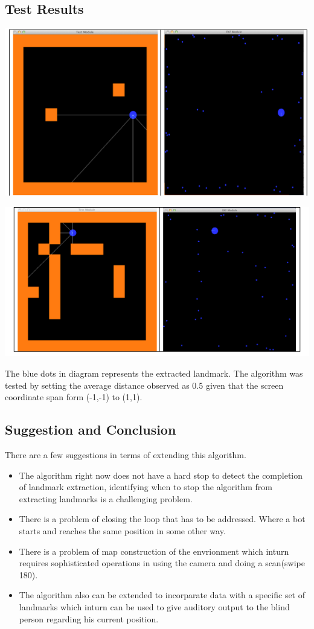 \documentclass[12pt]{article}
\begin{document}
\subsection{Test Results}
\begin{center} \includegraphics[scale=0.4]{p8} \end{center}
\begin{center} \includegraphics[scale=0.4]{p9} \end{center}

The blue dots in diagram represents the extracted landmark. The algorithm was tested by setting the average distance observed as 0.5 given that the screen coordinate span form (-1,-1) to (1,1)\cite{boost}.

\subsection{Suggestion and Conclusion}
There are a few suggestions in terms of extending this algorithm.
\begin{itemize}
\item The algorithm right now does not have a hard stop to detect the completion of landmark extraction, identifying when to stop the algorithm from extracting landmarks is a challenging problem.
\item There is a problem of closing the loop that has to be addressed. Where a bot starts and reaches the same position in some other way.
\item There is a problem of map construction of the envrionment which inturn requires sophisticated operations in using the camera and doing a scan(swipe 180).
\item The algorithm also can be extended to incorparate data with a specific set of landmarks which inturn can be used to give auditory output to the blind person regarding his current position.
\end{itemize}
\end{document}
